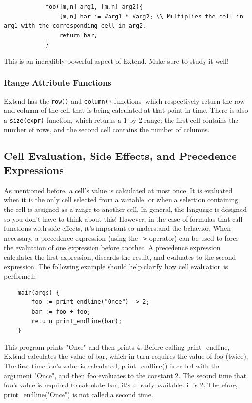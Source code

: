 		\begin{lstlisting}
			foo([m,n] arg1, [m.n] arg2){
				[m,n] bar := #arg1 * #arg2; \\ Multiplies the cell in arg1 with the corresponding cell in arg2.
				return bar;
			}
		\end{lstlisting}

		\medskip \noindent
		This is an incredibly powerful aspect of Extend. Make sure to study it well!

		\subsubsection{Range Attribute Functions}
		Extend has the \texttt{row()} and \texttt{column()} functions, which respectively return the row and column of the cell that is being calculated at that point in time.
		There is also a \texttt{size(expr)} function, which returns a 1 by 2 range; the first cell contains the number of rows, and the second cell contains the number of columns.

	\subsection{Cell Evaluation, Side Effects, and Precedence Expressions}
	As mentioned before, a cell's value is calculated at most once. It is evaluated when it is the only cell selected from a variable, or when a selection containing the cell is assigned as a range to another cell. In general, the language is designed so you don't have to think about this! However, in the case of formulas that call functions with side effects, it's important to understand the behavior. When necessary, a precedence expression (using the \texttt{->} operator) can be used to force the evaluation of one expression before another. A precedence expression calculates the first expression, discards the result, and evaluates to the second expression. The following example should help clarify how cell evaluation is performed:

	\begin{lstlisting}
	main(args) {
		foo := print_endline("Once") -> 2;
		bar := foo + foo;
		return print_endline(bar);
	}
	\end{lstlisting}

	\medskip \noindent
	This program prints "Once" and then prints 4. Before calling print\_endline, Extend calculates the value of bar, which in turn requires the value of foo (twice). The first time foo's value is calculated, print\_endline() is called with the argument "Once", and then foo evaluates to the constant 2. The second time that foo's value is required to calculate bar, it's already available: it is 2. Therefore, print\_endline("Once") is not called a second time.

